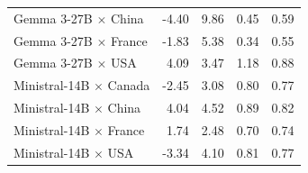 \begin{table}[htbp]
\begin{small}
\begin{sc}
\begin{tabular}{lrrll}
  Gemma 3-27B $\times$ China    & -4.40 & 9.86 & 0.45 & 0.59 \\
  Gemma 3-27B $\times$ France   & -1.83 & 5.38 & 0.34 & 0.55 \\
  Gemma 3-27B $\times$ USA      &  4.09 & 3.47 & 1.18 & 0.88 \\
  \midrule
  Ministral-14B $\times$ Canada & -2.45 & 3.08 & 0.80 & 0.77 \\
  Ministral-14B $\times$ China  &  4.04 & 4.52 & 0.89 & 0.82 \\
  Ministral-14B $\times$ France &  1.74 & 2.48 & 0.70 & 0.74 \\
  Ministral-14B $\times$ USA    & -3.34 & 4.10 & 0.81 & 0.77 \\
  \bottomrule
  \end{tabular}
  \end{sc}
  \end{small}
\end{table}

